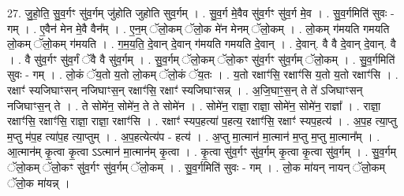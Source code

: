 \documentclass[17pt]{extarticle}
\begin{document}
27. जु॒हो॒ति॒ सु॒व॒र्गꣳ सु॑व॒र्गम् जु॑होति जुहोति सुव॒र्गम् । . सु॒व॒र्ग मे॒वैव सु॑व॒र्गꣳ सु॑व॒र्ग मे॒व । . सु॒व॒र्गमिति॑ सुवः - गम् । . ए॒वैन॑ मेन मे॒वै वैन᳚म् । . ए॒न॒म् ॅलो॒कम् ॅलो॒क मे॑न मेनम् ॅलो॒कम् । . लो॒कम् ग॑मयति गमयति लो॒कम् ॅलो॒कम् ग॑मयति । . ग॒म॒य॒ति॒ दे॒वान् दे॒वान् ग॑मयति गमयति दे॒वान् । . दे॒वान्. वै वै दे॒वान् दे॒वान्. वै । . वै सु॑व॒र्गꣳ सु॑व॒र्गं ॅवै वै सु॑व॒र्गम् । . सु॒व॒र्गम् ॅलो॒कम् ॅलो॒कꣳ सु॑व॒र्गꣳ सु॑व॒र्गम् ॅलो॒कम् । . सु॒व॒र्गमिति॑ सुवः - गम् । . लो॒कं ॅय॒तो य॒तो लो॒कम् ॅलो॒कं ॅय॒तः । . य॒तो रक्षाꣳ॑सि॒ रक्षाꣳ॑सि य॒तो य॒तो रक्षाꣳ॑सि । . रक्षाꣳ॑ स्यजिघाꣳसन् नजिघाꣳस॒न् रक्षाꣳ॑सि॒ रक्षाꣳ॑ स्यजिघाꣳसन्न् । . अ॒जि॒घाꣳ॒॒स॒न् ते ते॑ ऽजिघाꣳसन् नजिघाꣳस॒न् ते । . ते सोमे॑न॒ सोमे॑न॒ ते ते सोमे॑न । . सोमे॑न॒ राज्ञा॒ राज्ञा॒ सोमे॑न॒ सोमे॑न॒ राज्ञा᳚ । . राज्ञा॒ रक्षाꣳ॑सि॒ रक्षाꣳ॑सि॒ राज्ञा॒ राज्ञा॒ रक्षाꣳ॑सि । . रक्षाꣳ॑ स्यप॒हत्या॑ प॒हत्य॒ रक्षाꣳ॑सि॒ रक्षाꣳ॑ स्यप॒हत्य॑ । . अ॒प॒ह त्या॒प्तु म॒प्तु म॑प॒ह त्या॑प॒ह त्या॒प्तुम् । . अ॒प॒हत्येत्य॑प - हत्य॑ । . अ॒प्तु मा॒त्मान॑ मा॒त्मान॑ म॒प्तु म॒प्तु मा॒त्मान᳚म् । . आ॒त्मान॑म् कृ॒त्वा कृ॒त्वा ऽऽत्मान॑ मा॒त्मान॑म् कृ॒त्वा । . कृ॒त्वा सु॑व॒र्गꣳ सु॑व॒र्गम् कृ॒त्वा कृ॒त्वा सु॑व॒र्गम् । . सु॒व॒र्गम् ॅलो॒कम् ॅलो॒कꣳ सु॑व॒र्गꣳ सु॑व॒र्गम् ॅलो॒कम् । . सु॒व॒र्गमिति॑ सुवः - गम् । . लो॒क मा॑यन् नायन् ॅलो॒कम् ॅलो॒क मा॑यन्न् । \newline
\end{document}

